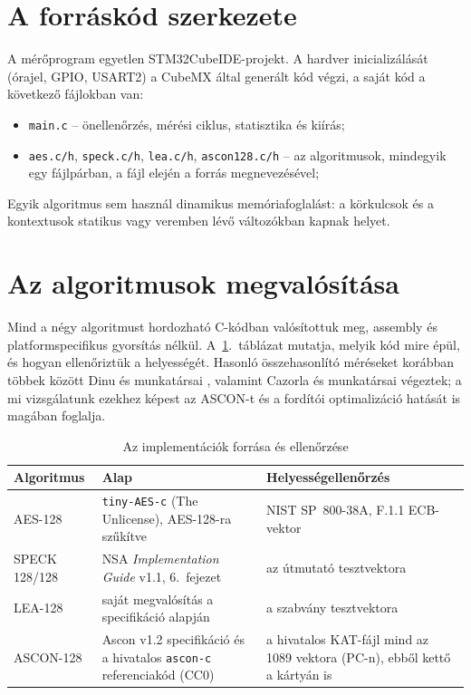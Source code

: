 \documentclass[a4paper,12pt]{report}
\theoremstyle{definition}
\theoremstyle{remark}
\begin{document}
\section{A forráskód szerkezete}

A mérőprogram egyetlen STM32CubeIDE-projekt. A hardver inicializálását (órajel, GPIO, USART2) a CubeMX által generált kód végzi, a saját kód a következő fájlokban van:

\begin{itemize}
	\item \texttt{main.c} -- önellenőrzés, mérési ciklus, statisztika és kiírás;
	\item \texttt{aes.c/h}, \texttt{speck.c/h}, \texttt{lea.c/h}, \texttt{ascon128.c/h} -- az algoritmusok, mindegyik egy fájlpárban, a fájl elején a forrás megnevezésével;
\end{itemize}

Egyik algoritmus sem használ dinamikus memóriafoglalást: a körkulcsok és a kontextusok statikus vagy veremben lévő változókban kapnak helyet.

\section{Az algoritmusok megvalósítása}\label{sec:megvalositas}

Mind a négy algoritmust hordozható C-kódban valósítottuk meg, assembly és platformspecifikus gyorsítás nélkül. A~\ref{tab:forrasok}.~táblázat mutatja, melyik kód mire épül, és hogyan ellenőriztük a helyességét. Hasonló összehasonlító méréseket korábban többek között Dinu és munkatársai \cite{Dinu2015}, valamint Cazorla és munkatársai \cite{Cazorla2013} végeztek; a mi vizsgálatunk ezekhez képest az ASCON-t és a fordítói optimalizáció hatását is magában foglalja.

\begin{table}[htbp]
    \centering
    \small
    \caption{Az implementációk forrása és ellenőrzése}
    \label{tab:forrasok}
    \begin{tabularx}{\textwidth}{|l|X|X|}
        \hline
        \textbf{Algoritmus} & \textbf{Alap} & \textbf{Helyességellenőrzés} \\ \hline
        AES-128 & \texttt{tiny-AES-c} \cite{TinyAES} (The Unlicense), AES-128-ra szűkítve & NIST SP~800-38A, F.1.1 ECB-vektor \cite{SP80038A} \\ \hline
        SPECK 128/128 & NSA \emph{Implementation Guide} v1.1, 6.~fejezet \cite{Beaulieu2019} & az útmutató tesztvektora \\ \hline
        LEA-128 & saját megvalósítás a specifikáció alapján \cite{Hong2013,Lee2014} & a szabvány tesztvektora \cite{KISALEA} \\ \hline
        ASCON-128 & Ascon v1.2 specifikáció \cite{Dobraunig2021} és a hivatalos \texttt{ascon-c} referenciakód \cite{AsconC} (CC0) & a hivatalos KAT-fájl mind az 1089 vektora (PC-n), ebből kettő a kártyán is \\ \hline
    \end{tabularx}
\end{table}
\end{document}
